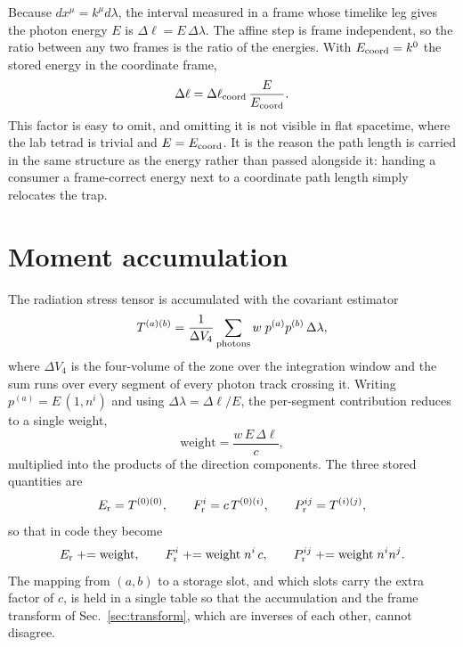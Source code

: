 \documentclass[11pt]{article}
\begin{document}
Because $dx^\mu = k^\mu d\lambda$, the interval measured in a frame whose timelike leg
gives the photon energy $E$ is $\Delta \ell = E \, \Delta\lambda$. The affine step is
frame independent, so the ratio between any two frames is the ratio of the energies. With
$E_{\rm coord} = k^0$ the stored energy in the coordinate frame,
\begin{equation}
  \Delta \ell = \Delta \ell_{\rm coord} \, \frac{E}{E_{\rm coord}} .
  \label{eq:dl}
\end{equation}
This factor is easy to omit, and omitting it is not visible in flat spacetime, where the
lab tetrad is trivial and $E = E_{\rm coord}$. It is the reason the path length is carried
in the same structure as the energy rather than passed alongside it: handing a consumer a
frame-correct energy next to a coordinate path length simply relocates the trap.

\section{Moment accumulation}
\label{sec:accumulate}

The radiation stress tensor is accumulated with the covariant estimator
\begin{equation}
  T^{(a)(b)} = \frac{1}{\Delta V_4} \sum_{\rm photons} w \; p^{(a)} p^{(b)} \, \Delta\lambda ,
  \label{eq:estimator}
\end{equation}
where $\Delta V_4$ is the four-volume of the zone over the integration window and the sum
runs over every segment of every photon track crossing it. Writing
$p^{(a)} = E\,(1, n^i)$ and using $\Delta\lambda = \Delta \ell / E$, the per-segment
contribution reduces to a single weight,
\begin{equation}
  \text{weight} = \frac{w \, E \, \Delta \ell}{c} ,
\end{equation}
multiplied into the products of the direction components. The three stored quantities are
\begin{equation}
  E_{\rm r} = T^{(0)(0)} , \qquad
  F_{\rm r}^{i} = c \, T^{(0)(i)} , \qquad
  P_{\rm r}^{ij} = T^{(i)(j)} ,
\end{equation}
so that in code they become
\begin{equation}
  E_{\rm r} \mathrel{+}= \text{weight} , \qquad
  F_{\rm r}^{i} \mathrel{+}= \text{weight} \; n^i \, c , \qquad
  P_{\rm r}^{ij} \mathrel{+}= \text{weight} \; n^i n^j .
\end{equation}
The mapping from $(a,b)$ to a storage slot, and which slots carry the extra factor of $c$,
is held in a single table so that the accumulation and the frame transform of
Sec.~\ref{sec:transform}, which are inverses of each other, cannot disagree.
\end{document}
